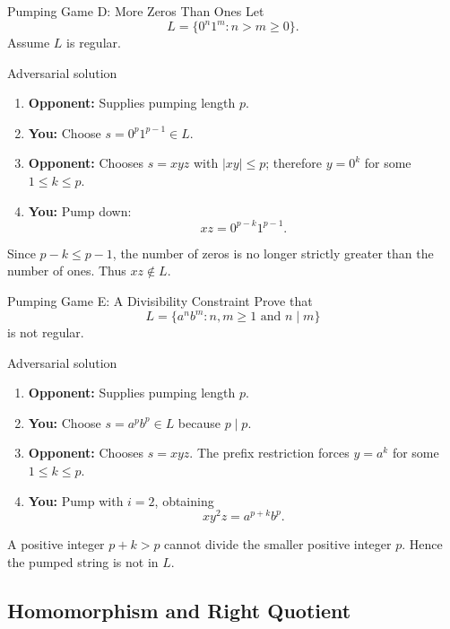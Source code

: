 \documentclass[10pt]{beamer}
\begin{document}
\begin{frame}{Pumping Game D: More Zeros Than Ones}
  \small
  Let
  \[
    L=\{0^n1^m:n>m\ge0\}.
  \]
  Assume $L$ is regular.
  \begin{alertblock}{Adversarial solution}
    \begin{enumerate}
      \item \textbf{Opponent:} Supplies pumping length $p$.
      \item \textbf{You:} Choose $s=0^p1^{p-1}\in L$.
      \item \textbf{Opponent:} Chooses $s=xyz$ with $|xy|\le p$; therefore
        $y=0^k$ for some $1\le k\le p$.
      \item \textbf{You:} Pump down:
        \[
          xz=0^{p-k}1^{p-1}.
        \]
    \end{enumerate}
  \end{alertblock}
  Since $p-k\le p-1$, the number of zeros is no longer strictly greater than
  the number of ones. Thus $xz\notin L$.
\end{frame}

\begin{frame}{Pumping Game E: A Divisibility Constraint}
  \small
  Prove that
  \[
    L=\{a^n b^m:n,m\ge1\text{ and }n\mid m\}
  \]
  is not regular.
  \begin{alertblock}{Adversarial solution}
    \begin{enumerate}
      \item \textbf{Opponent:} Supplies pumping length $p$.
      \item \textbf{You:} Choose $s=a^pb^p\in L$ because $p\mid p$.
      \item \textbf{Opponent:} Chooses $s=xyz$. The prefix restriction forces
        $y=a^k$ for some $1\le k\le p$.
      \item \textbf{You:} Pump with $i=2$, obtaining
        \[
          xy^2z=a^{p+k}b^p.
        \]
    \end{enumerate}
  \end{alertblock}
  A positive integer $p+k>p$ cannot divide the smaller positive integer $p$.
  Hence the pumped string is not in $L$.
\end{frame}

\subsection{Homomorphism and Right Quotient}
\end{document}
